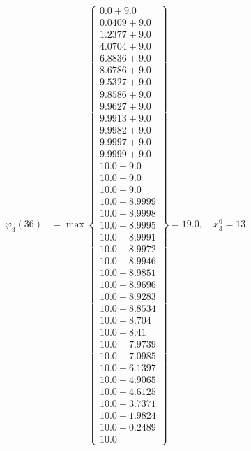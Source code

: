 \documentclass{article}
\begin{document}
\begin{align*}
\varphi_{3}(36) &= \max \left\{ \begin{array}{c}
0.0 + 9.0 \\
 0.0409 + 9.0 \\
 1.2377 + 9.0 \\
 4.0704 + 9.0 \\
 6.8836 + 9.0 \\
 8.6786 + 9.0 \\
 9.5327 + 9.0 \\
 9.8586 + 9.0 \\
 9.9627 + 9.0 \\
 9.9913 + 9.0 \\
 9.9982 + 9.0 \\
 9.9997 + 9.0 \\
 9.9999 + 9.0 \\
 10.0 + 9.0 \\
 10.0 + 9.0 \\
 10.0 + 9.0 \\
 10.0 + 8.9999 \\
 10.0 + 8.9998 \\
 10.0 + 8.9995 \\
 10.0 + 8.9991 \\
 10.0 + 8.9972 \\
 10.0 + 8.9946 \\
 10.0 + 8.9851 \\
 10.0 + 8.9696 \\
 10.0 + 8.9283 \\
 10.0 + 8.8534 \\
 10.0 + 8.704 \\
 10.0 + 8.41 \\
 10.0 + 7.9739 \\
 10.0 + 7.0985 \\
 10.0 + 6.1397 \\
 10.0 + 4.9065 \\
 10.0 + 4.6125 \\
 10.0 + 3.7371 \\
 10.0 + 1.9824 \\
 10.0 + 0.2489 \\
 10.0
\end{array} \right\}=19.0, \quad x_{3}^0=13\\
  
 \\ 
\end{align*}
\end{document}
